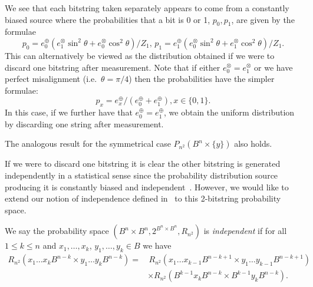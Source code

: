 \documentclass[%
 preprint,
 showpacs,
 showkeys,
 preprintnumbers,
  amsmath,amssymb,
  aps,
 pra,
  longbibliography,
  floatfix,
 ]{revtex4-1}
\theoremstyle{definition}
\newtheorem{Definition}[Theorem]{Definition}
\begin{document}
We see that each bitstring taken separately appears to come from a constantly biased source where the probabilities that a bit is 0 or 1, $p_0,p_1$, are given by the formulae
$$p_0 = e_0^\oplus (e_1^\otimes\sin^2\theta+e_0^\otimes\cos^2\theta)/Z_1, \, p_1 = e_1^\oplus (e_0^\otimes\sin^2\theta+e_1^\otimes\cos^2\theta)/Z_1.$$
This can alternatively be viewed as the distribution obtained if we were to discard one bitstring after measurement.
Note that if either $e_0^\otimes = e_1^\otimes$ or we have perfect misalignment (i.e.\ $\theta=\pi/4$) then the probabilities have the simpler formulae: $$p_x=e_x^\oplus/(e_0^\oplus + e_1^\oplus), x\in\{0,1\}.$$ In this case, if we further have that $e_0^\oplus = e_1^\oplus$, we obtain the uniform distribution by discarding one string after measurement.

The analogous result for the symmetrical case $P_{n^2}\left(B^n \times \{y\} \right)$ also holds.

If we were to discard one bitstring it is clear the other bitstring is generated independently in a statistical sense since the probability distribution source producing it is  constantly biased and independent~\cite{AbbottCalude10}. However, we would like to extend our notion of independence defined in~\cite{AbbottCalude10} to this 2-bitstring probability space.

	We say the probability space $(B^n\times B^n,2^{B^n\times B^n},R_{n^2})$ is {\it independent} if for all $1\le k \le n$ and $x_1,\dots,x_k$, $y_1,\dots,y_k \in B$ we have
	\begin{align*}
		R_{n^2}(x_1\dots x_k B^{n-k} \times y_1\dots y_k B^{n-k})=& \, R_{n^2}(x_1\dots x_{k-1} B^{n-k+1} \times y_1\dots y_{k-1} B^{n-k+1})\\
		&\times R_{n^2}(B^{k-1}x_k B^{n-k} \times B^{k-1} y_k B^{n-k}).
	\end{align*}
\end{document}
